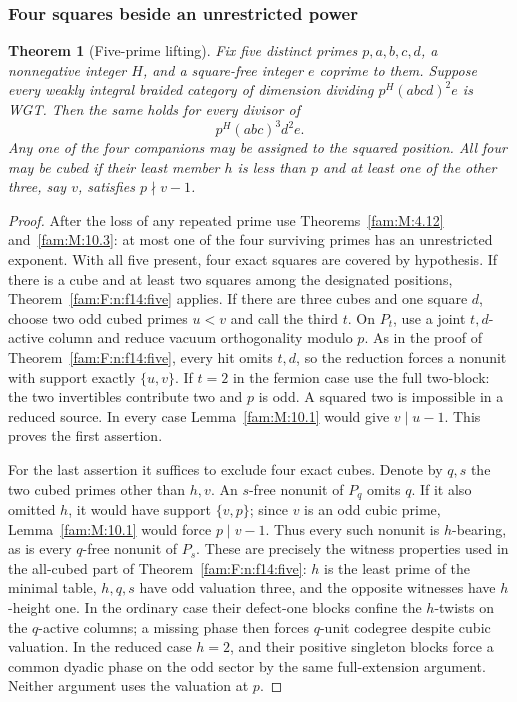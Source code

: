 \documentclass[11pt,a4paper]{article}
\numberwithin{equation}{section}
\newtheorem{theorem}{Theorem}[section]
\theoremstyle{remark}
\begin{document}
\subsubsection{Four squares beside an unrestricted power}\label{fam:F:sec:5.8}
\begin{theorem}[Five-prime lifting]\label{fam:F:5.12}\label{fam:F:n:liftfour}
Fix five distinct primes $p,a,b,c,d$, a nonnegative integer $H$, and a square-free integer $e$ coprime to them. Suppose every weakly integral braided category of dimension dividing $p^H(abcd)^2e$ is WGT. Then the same holds for every divisor of
\[
                         p^H(abc)^3d^2e .
\]
Any one of the four companions may be assigned to the squared position. All four may be cubed if their least member $h$ is less than $p$ and at least one of the other three, say $v$, satisfies $p\nmid v-1$.
\end{theorem}
\begin{proof}
After the loss of any repeated prime use Theorems~\ref{fam:M:4.12} and~\ref{fam:M:10.3}: at most one of the four surviving primes has an unrestricted exponent. With all five present, four exact squares are covered by hypothesis. If there is a cube and at least two squares among the designated positions, Theorem~\ref{fam:F:n:f14:five} applies. If there are three cubes and one square $d$, choose two odd cubed primes $u<v$ and call the third $t$. On $P_t$, use a joint $t,d$-active column and reduce vacuum orthogonality modulo $p$. As in the proof of Theorem~\ref{fam:F:n:f14:five}, every hit omits $t,d$, so the reduction forces a nonunit with support exactly $\{u,v\}$. If $t=2$ in the fermion case use the full two-block: the two invertibles contribute two and $p$ is odd. A squared two is impossible in a reduced source. In every case Lemma~\ref{fam:M:10.1} would give $v\mid u-1$. This proves the first assertion.

For the last assertion it suffices to exclude four exact cubes. Denote by $q,s$ the two cubed primes other than $h,v$. An $s$-free nonunit of $P_q$ omits $q$. If it also omitted $h$, it would have support $\{v,p\}$; since $v$ is an odd cubic prime, Lemma~\ref{fam:M:10.1} would force $p\mid v-1$. Thus every such nonunit is $h$-bearing, as is every $q$-free nonunit of $P_s$. These are precisely the witness properties used in the all-cubed part of Theorem~\ref{fam:F:n:f14:five}: $h$ is the least prime of the minimal table, $h,q,s$ have odd valuation three, and the opposite witnesses have $h$-height one. In the ordinary case their defect-one blocks confine the $h$-twists on the $q$-active columns; a missing phase then forces $q$-unit codegree despite cubic valuation. In the reduced case $h=2$, and their positive singleton blocks force a common dyadic phase on the odd sector by the same full-extension argument. Neither argument uses the valuation at $p$.
\end{proof}
\end{document}
